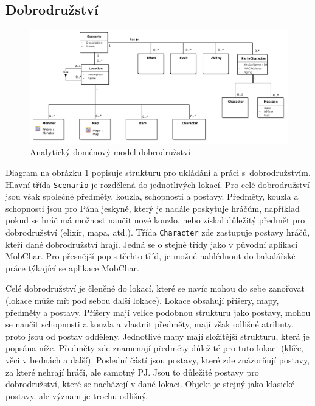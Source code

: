 \documentclass[thesis=B,czech]{resources/FITthesis}[2012/06/26]
\begin{document}
\subsection{Dobrodružství}
\begin{figure}\centering
	\includegraphics[width=1\textwidth]{images/domain_scenario}
	\caption[Analytický doménový model dobrodružství]{Analytický doménový model dobrodružství}\label{fig:dm_scenario}
\end{figure}
Diagram na obrázku \ref{fig:dm_scenario} popisuje strukturu pro ukládání a práci s~dobrodružstvím. Hlavní třída \texttt{Scenario} je rozdělená do jednotlivých lokací. Pro celé dobrodružství jsou však společné předměty, kouzla, schopnosti a postavy. Předměty, kouzla a schopnosti jsou pro Pána jeskyně, který je nadále poskytuje hráčům, například pokud se hráč má možnost naučit nové kouzlo, nebo získal důležitý předmět pro dobrodružství (elixír, mapa, atd.). Třída \texttt{Character} zde zastupuje postavy hráčů, kteří dané dobrodružství hrají. Jedná se o stejné třídy jako v původní aplikaci MobChar. Pro přesnější popis těchto tříd, je možné nahlédnout do bakalářské práce týkající se aplikace MobChar\cite{Weberova_2017}.\par

Celé dobrodružství je členěné do lokací, které se navíc mohou do sebe zanořovat (lokace může mít pod sebou další lokace). Lokace obsahují příšery, mapy, předměty a postavy. Příšery mají velice podobnou strukturu jako postavy, mohou se naučit schopnosti a kouzla a vlastnit předměty, mají však odlišné atributy, proto jsou od postav odděleny. Jednotlivé mapy mají složitější strukturu, která je popsána níže. Předměty zde znamenají předměty důležité pro tuto lokaci (klíče, věci v bednách a další). Poslední částí jsou postavy, které zde znázorňují postavy, za které nehrají hráči, ale samotný PJ. Jsou to důležité postavy pro dobrodružství, které se nacházejí v dané lokaci. Objekt je stejný jako klasické postavy, ale význam je trochu odlišný.
\end{document}
